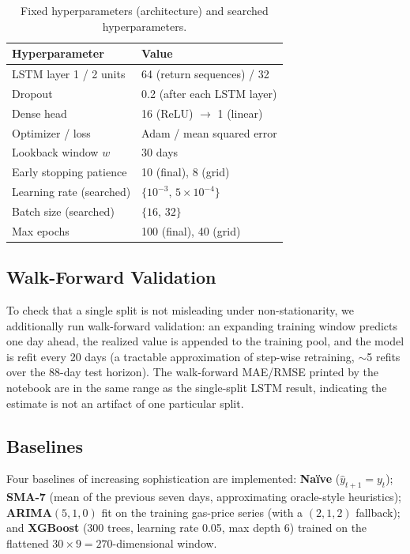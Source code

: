 \documentclass[11pt,a4paper]{article}
\begin{document}
\begin{table}[h]
\centering
\caption{Fixed hyperparameters (architecture) and searched hyperparameters.}
\label{tab:hparams}
\small
\begin{tabular}{@{}ll@{}}
\toprule
\textbf{Hyperparameter} & \textbf{Value} \\
\midrule
LSTM layer 1 / 2 units      & 64 (return sequences) / 32 \\
Dropout                     & 0.2 (after each LSTM layer) \\
Dense head                  & 16 (ReLU) $\to$ 1 (linear) \\
Optimizer / loss            & Adam / mean squared error \\
Lookback window $w$         & 30 days \\
Early stopping patience     & 10 (final), 8 (grid) \\
Learning rate (searched)    & $\{10^{-3},\,5\times10^{-4}\}$ \\
Batch size (searched)       & $\{16,\,32\}$ \\
Max epochs                  & 100 (final), 40 (grid) \\
\bottomrule
\end{tabular}
\end{table}

\subsection{Walk-Forward Validation}
To check that a single split is not misleading under non-stationarity, we additionally run
walk-forward validation: an expanding training window predicts one day ahead, the realized value
is appended to the training pool, and the model is refit every 20 days (a tractable approximation
of step-wise retraining, $\sim$5 refits over the 88-day test horizon). The walk-forward MAE/RMSE
printed by the notebook are in the same range as the single-split LSTM result, indicating the
estimate is not an artifact of one particular split.

\subsection{Baselines}
Four baselines of increasing sophistication are implemented: \textbf{Na\"ive}
($\hat{y}_{t+1}=y_t$); \textbf{SMA-7} (mean of the previous seven days, approximating
oracle-style heuristics); \textbf{ARIMA}$(5,1,0)$ fit on the training gas-price series (with a
$(2,1,2)$ fallback); and \textbf{XGBoost} (300 trees, learning rate 0.05, max depth 6) trained on
the flattened $30\times9=270$-dimensional window.
\end{document}
